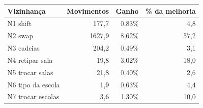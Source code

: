 \begin{tabular}{lrrr}
\hline
Vizinhança & Movimentos & Ganho & \% da melhoria \\
\hline
N1 shift & 177,7 & 0,83\% & 4,8 \\
N2 swap & 1627,9 & 8,62\% & 57,2 \\
N3 cadeias & 204,2 & 0,49\% & 3,1 \\
N4 retipar sala & 19,8 & 3,02\% & 18,0 \\
N5 trocar salas & 21,8 & 0,40\% & 2,6 \\
N6 tipo da escola & 1,9 & 0,63\% & 4,4 \\
N7 trocar escolas & 3,6 & 1,30\% & 10,0 \\
\hline
\end{tabular}
